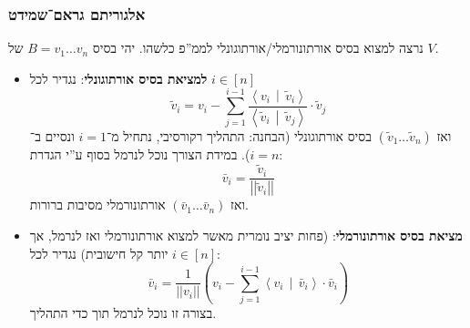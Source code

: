 \documentclass[a4paper]{article}
\newcommand\ra    {\rangle}
\newcommand\la    {\langle}
\newcommand\norm[1]   {\left \vert \left \vert #1 \right \vert \right \vert}
\newcommand\mut [2]   {\left \la #1 \,\middle\vert\, #2 \right \ra}
\newcommand\tl    {\tilde}
\newcommand\cl [1]    {\left ( #1 \right )}
\theoremstyle{definition}
\begin{document}
	\subsubsection{אלגוריתם גראם־שמידט}
	נרצה למצוא בסיס אורתונורמלי/אורתוגונלי לממ''פ כלשהו. יהי בסיס $B = v_1 \dots v_n$ של $V$. 
	\begin{itemize}
		\item \textbf{למציאת בסיס אורתוגונלי}: נגדיר לכל $i \in [n]$
		\[ \tl v_i = v_i - \sum_{j = 1}^{i - 1}\frac{\mut{v_i}{\tl v_i}}{\mut{\tl v_i}{\tl v_j}} \cdot \tl v_j \]
		ואז $(\tl v_1 \dots \tl v_n)$ בסיס אורתוגונלי (הבחנה: התהליך רקורסיבי, נתחיל מ־$i = 1$ ונסיים ב־$i = n$). במידת הצורך נוכל לנרמל בסוף ע''י הגדרת: 
		\[ \bar v_i = \frac{\tl v_i}{\norm{\tl v_i}} \]
		ואז $(\bar v_1 \dots \bar v_n)$ אורתונורמלי מסיבות ברורות. 
		\item \textbf{מציאת בסיס אורתונורמלי}: (פחות יציב נומרית מאשר למצוא אורתונורמלי ואז לנרמל, אך יותר קל חישובית) נגדיר לכל $i \in [n]$: 
		\[ \bar v_i = \frac{1}{\norm{v_i}} \cl{v_i - \sum_{j = 1}^{i - 1}\mut{v_i}{\bar v_i} \cdot \bar v_i} \]
		בצורה זו נוכל לנרמל תוך כדי התהליך. 
	\end{itemize}
\end{document}
